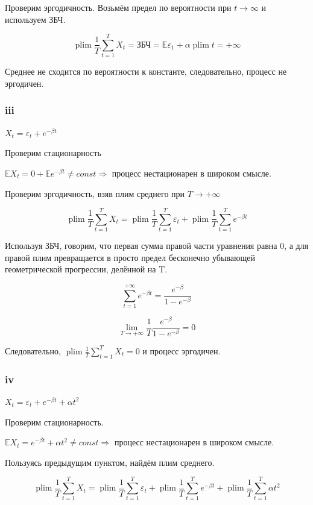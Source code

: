 \documentclass[a4paper,12pt]{article}
\def \e{\varepsilon}
\DeclareMathOperator*{\plim}{plim}
\def \mbb{\mathbb}
\def \E{\mbb{E}}
\def \b{\beta}
\def \e{\varepsilon}
\begin{document}
 Проверим эргодичность. Возьмём предел по вероятности при $ t \to \infty $ и используем ЗБЧ.
 
 \[ \plim \frac{1}{T} \sum_{t = 1}^{T}X_t = \text{ЗБЧ} = \E \e_1 + \alpha \plim t = +\infty\] 
 
 Среднее не сходится по вероятности к константе, следовательно, процесс не эргодичен.
 
 

\subsubsection{iii}

$ X_t = \e_t + e^{-\beta t} $

Проверим стационарность

$ \E X_t = 0 + \E e^{-\beta t} \neq const \Rightarrow $ процесс нестационарен в широком смысле.

Проверим эргодичность, взяв плим среднего при $ T \to +\infty $

 \[\plim \frac{1}{T} \sum_{t = 1}^{T}X_t = \plim \frac{1}{T} \sum_{t = 1}^{T}\e_t + \plim \frac{1}{T} \sum_{t = 1}^{T}e^{-\b t}\] 
 
Используя ЗБЧ, говорим, что первая сумма правой части уравнения равна 0, а для правой плим превращается в просто предел бесконечно убывающей геометрической прогрессии, делённой на T. 

\[\sum_{t = 1}^{+\infty}e^{-\b t} = \frac{e^{-\b}}{1 - e^{-\b}}\]

\[ \lim\limits_{T \to +\infty} \frac{1}{T} \frac{e^{-\b}}{1 - e^{-\b}} =  0\]

Следовательно, $ \plim \frac{1}{T} \sum_{t = 1}^{T}X_t = 0 $ и процесс эргодичен.

\subsubsection{iv}

$ X_t = \e_t + e^{-\b t} + \alpha t^2 $

Проверим стационарность.

$ \E X_t = e^{-\b t} + \alpha t^2 \neq const \Rightarrow $ процесс нестационарен в широком смысле.

Пользуясь предыдущим пунктом, найдём плим среднего.

\[\plim \frac{1}{T} \sum_{t = 1}^{T}X_t = \plim \frac{1}{T} \sum_{t = 1}^{T}\e_t + \plim \frac{1}{T} \sum_{t = 1}^{T}e^{-\b t} +  \plim \frac{1}{T} \sum_{t = 1}^{T}\alpha t^2\] 
\end{document}
